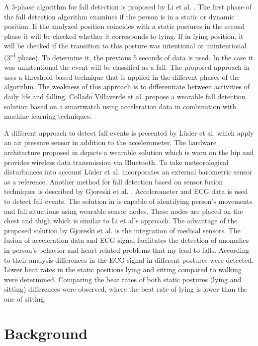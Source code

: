 \documentclass[10pt,journal,compsoc]{IEEEtran}
\begin{document}
A 3-phase algorithm for fall detection is proposed by Li et al. \cite{Li2009}. The first phase of the fall detection algorithm examines if the person is in a static or dynamic position. If the analyzed position coincides with a static postures in the second phase it will be checked whether it corresponds to lying. If in lying position, it will be checked if the transition to this posture was intentional or unintentional (3\textsuperscript{rd} phase). To determine it, the previous 5 seconds of data is used. In the case it was unintentional the event will be classified as a fall. The proposed approach in \cite{Li2009} uses a threshold-based technique that is applied in the different phases of the algorithm. The weakness of this approach is to differentiate between activities of daily life and falling. Collado Villaverde et al. \cite{colladomachine} propose a wearable fall detection solution based on a smartwatch using acceleration data in combination with machine learning techniques.

A different approach to detect fall events is presented by Lüder et al. \cite{Luder2009} which apply an air pressure sensor in addition to the accelerometer. The hardware architecture proposed in \cite{Luder2009} depicts a wearable solution which is worn on the hip and provides wireless data transmission via Bluetooth. To take meteorological disturbances into account Lüder et al. \cite{Luder2009} incorporates an external barometric sensor as a reference. Another method for fall detection based on sensor fusion techniques is described by Gjoreski et al. \cite{Gjoreski2014}. Accelerometer and ECG data is used to detect fall events. The solution in \cite{Gjoreski2014} is capable of identifying person's movements and fall situations using wearable sensor nodes. These nodes are placed on the chest and thigh which is similar to Li et al's \cite{Li2009} approach. The advantage of the proposed solution by Gjoreski et al. \cite{Gjoreski2014} is the integration of medical sensors. The fusion of acceleration data and ECG signal facilitates the detection of anomalies in person's behavior and heart related problems that my lead to falls. According to their analysis differences in the ECG signal in different postures were detected. Lower beat rates in the static positions lying and sitting compared to walking were determined. Comparing the beat rates of both static postures (lying and sitting) differences were observed, where the beat rate of lying is lower than the one of sitting.

\section{Background}
\label{sec:background}
\end{document}
